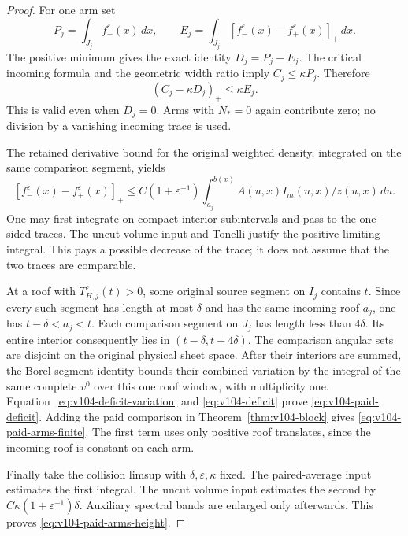\begin{proof}
For one arm set
\[
 P_j=\int_{J_j}f_-^\varepsilon(x)\,dx,\qquad
 E_j=\int_{J_j}[f_-^\varepsilon(x)-f_+^\varepsilon(x)]_+\,dx.
\]
The positive minimum gives the exact identity $D_j=P_j-E_j$.
The critical incoming formula and the geometric width ratio imply
$C_j\le\kappa P_j$. Therefore
\begin{equation}\label{eq:v104-deficit-variation}
                  (C_j-\kappa D_j)_+\le\kappa E_j.
\end{equation}
This is valid even when $D_j=0$. Arms with $N_*=0$ again contribute
zero; no division by a vanishing incoming trace is used.

The retained derivative bound for the original weighted density,
integrated on the same comparison segment, yields
\[
 [f_-^\varepsilon(x)-f_+^\varepsilon(x)]_+
 \le C(1+\varepsilon^{-1})
        \int_{a_j}^{b(x)} A(u,x)I_m(u,x)/z(u,x)\,du.
\]
One may first integrate on compact interior subintervals and pass to
the one-sided traces. The uncut volume input and Tonelli justify
the positive limiting integral. This pays a possible decrease of
the trace; it does not assume that the two traces are comparable.

At a roof with $T_{H,j}^\varepsilon(t)>0$, some original source
segment on $I_j$ contains $t$. Since every such segment has length
at most $\delta$ and has the same incoming roof $a_j$, one has
$t-\delta<a_j<t$. Each comparison segment on $J_j$ has length
less than $4\delta$. Its entire interior consequently lies in
$(t-\delta,t+4\delta)$. The comparison angular sets are disjoint
on the original physical sheet space. After their interiors are
summed, the Borel segment identity bounds their combined variation
by the integral of the same complete $v^0$ over this one roof window,
with multiplicity one. Equation~\eqref{eq:v104-deficit-variation}
and \eqref{eq:v104-deficit} prove \eqref{eq:v104-paid-deficit}.
Adding the paid comparison in Theorem~\ref{thm:v104-block} gives
\eqref{eq:v104-paid-arms-finite}. The first term uses only positive
roof translates, since the incoming roof is constant on each arm.

Finally take the collision limsup with $\delta,\varepsilon,\kappa$
fixed. The paired-average input estimates the first integral. The
uncut volume input estimates the second by
$C\kappa(1+\varepsilon^{-1})\delta$. Auxiliary spectral bands are
enlarged only afterwards. This proves \eqref{eq:v104-paid-arms-height}.
\end{proof}


